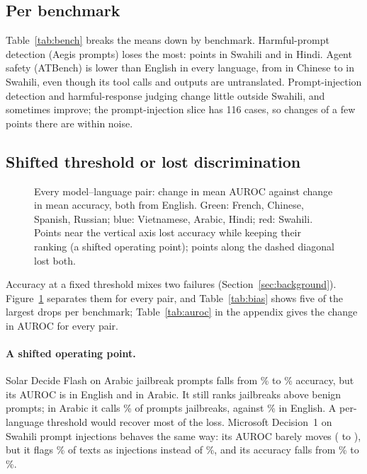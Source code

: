 \subsection{Per benchmark}



Table~\ref{tab:bench} breaks the means down by benchmark. Harmful-prompt
detection (Aegis prompts) loses the most: \MLbenchSWAegisPrompts{} points in
Swahili and \MLbenchHIAegisPrompts{} in Hindi. Agent safety (ATBench) is lower
than English in every language, from \MLbenchZHAtbench{} in Chinese to
\MLbenchSWAtbench{} in Swahili, even though its tool calls and outputs are
untranslated. Prompt-injection detection and harmful-response judging change
little outside Swahili, and sometimes improve; the prompt-injection slice has
116 cases, so changes of a few points there are within noise.

\subsection{Shifted threshold or lost discrimination}
\label{sec:threshold}

\begin{figure}[t]
\centering

\caption{Every model--language pair: change in mean AUROC against change in
mean accuracy, both from English. Green: French, Chinese, Spanish, Russian;
blue: Vietnamese, Arabic, Hindi; red: Swahili. Points near the vertical axis
lost accuracy while keeping their ranking (a shifted operating point); points
along the dashed diagonal lost both.}
\label{fig:scatter}
\end{figure}



Accuracy at a fixed threshold mixes two failures (Section~\ref{sec:background}).
Figure~\ref{fig:scatter} separates them for every pair, and
Table~\ref{tab:bias} shows five of the largest drops per benchmark;
Table~\ref{tab:auroc} in the appendix gives the change in AUROC for every pair.

\paragraph{A shifted operating point.} Solar Decide Flash on Arabic jailbreak
prompts falls from \MLaccEnSolarDecideFlashARJailbreak\% to
\MLaccSolarDecideFlashARJailbreak\% accuracy, but its AUROC is
\MLaucEnSolarDecideFlashARJailbreak{} in English and
\MLaucSolarDecideFlashARJailbreak{} in Arabic. It still ranks jailbreaks above
benign prompts; in Arabic it calls \MLyesSolarDecideFlashARJailbreak\% of
prompts jailbreaks, against \MLyesEnSolarDecideFlashARJailbreak\% in English.
A per-language threshold would recover most of the loss. Microsoft Decision~1
on Swahili prompt injections behaves the same way: its AUROC barely moves
(\MLaucEnMicrosoftDecisionSWPromptInj{} to \MLaucMicrosoftDecisionSWPromptInj),
but it flags \MLyesMicrosoftDecisionSWPromptInj\% of texts as injections
instead of \MLyesEnMicrosoftDecisionSWPromptInj\%, and its accuracy falls from
\MLaccEnMicrosoftDecisionSWPromptInj\% to \MLaccMicrosoftDecisionSWPromptInj\%.

